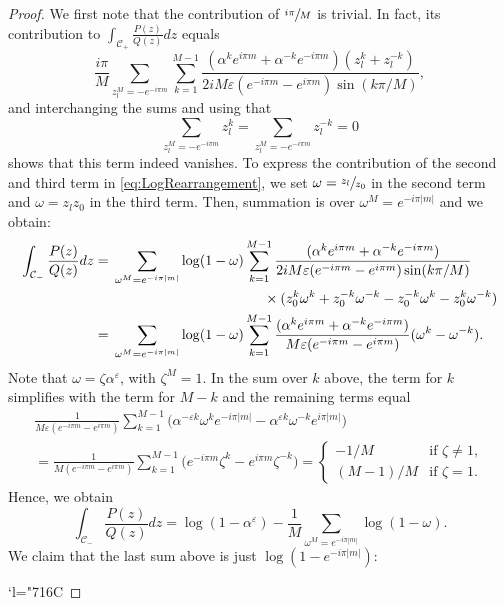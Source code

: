 \documentclass[10pt]{amsart}
\newcommand{\Changelback}{\mathcode`l="716C}
\theoremstyle{plain}
\theoremstyle{definition}
\theoremstyle{remark}
\numberwithin{equation}{section}
\begin{document}
\begin{proof}
We first note that the contribution of $\sfrac{i\pi}{M}$ is trivial. In fact, its contribution to $\int_{\mathcal C_+} \frac{P(z)}{Q(z)}dz$ equals
\[
\frac{i\pi}{M}\sum_{z_l^M=-e^{-i\pi m}}\sum_{k=1}^{M-1}\frac {(\alpha^k e^{i\pi m} + \alpha^{-k}e^{-i\pi m})(z_l^k+z_l^{-k})}{2iM\varepsilon(e^{-i\pi m}-e^{i\pi m}) \sin(k\pi/M)},
\]
and interchanging the sums and using that
\[
\sum_{z_l^M=-e^{-i\pi m}}z_l^k = \sum_{z_l^M=-e^{-i\pi m}}z_l^{-k} = 0
\]
shows that this term indeed vanishes. To express the contribution of the second and third term in \cref{eq:LogRearrangement}, we set $\omega = \sfrac {z_l}{z_0}$ in the second term and $\omega = z_l z_0$ in the third term. Then, summation is over $\omega^M=e^{-i\pi|m|}$ and we obtain:
\begin{align*}
\int_{\mathcal C_-} \frac{P(z)}{Q(z)} dz ={}& \sum_{\omega^M=e^{-i\pi |m|}} \log(1-\omega) \sum_{k=1}^{M-1} \frac {(\alpha^k e^{i\pi m} + \alpha^{-k}e^{-i\pi m})}{2iM\varepsilon(e^{-i\pi m} - e^{i\pi m}) \sin(k\pi/M)}\\
&\hspace{3.8cm}\times(z_0^k\omega^k + z_0^{-k} \omega^{-k} - z_0^{-k} \omega^k - z_0^k \omega^{-k})\\
={}& \sum_{\omega^M=e^{-i\pi |m|}} \log(1-\omega) \sum_{k=1}^{M-1} \frac {(\alpha^k e^{i\pi m} + \alpha^{-k}e^{-i\pi m})}{M\varepsilon(e^{-i\pi m} - e^{i\pi m})}(\omega^k-\omega^{-k}).
\end{align*}
Note that $\omega=\zeta \alpha^\varepsilon$, with $\zeta^M=1$. In the sum over $k$ above, the term for $k$ simplifies with the term for $M-k$ and the remaining terms equal
\begin{multline*}
\frac 1 {M\varepsilon(e^{-i\pi m} - e^{i\pi m})} \sum_{k=1}^{M-1}\big(\alpha^{-\varepsilon k}\omega^ke^{-i\pi|m|}-\alpha^{\varepsilon k}\omega^{-k}e^{i\pi|m|}\big)\\
= \frac 1 {M(e^{-i\pi m} - e^{i\pi m})} \sum_{k=1}^{M-1} \big(e^{-i\pi m}\zeta^k - e^{i\pi m} \zeta^{-k}\big) = \begin{cases} -1/M & \text{if } \zeta \neq 1,\\ (M-1)/M & \text{if } \zeta = 1.\end{cases}
\end{multline*}
Hence, we obtain
\[
\int_{\mathcal C_-} \frac{P(z)}{Q(z)}dz = \log(1-\alpha^\varepsilon) - \frac 1 M \sum_{\omega^M = e^{-i\pi |m|}} \log (1-\omega).
\]
We claim that the last sum above is just $\log (1-e^{-i\pi |m|})$:

\Changelback


\end{proof}
\end{document}
